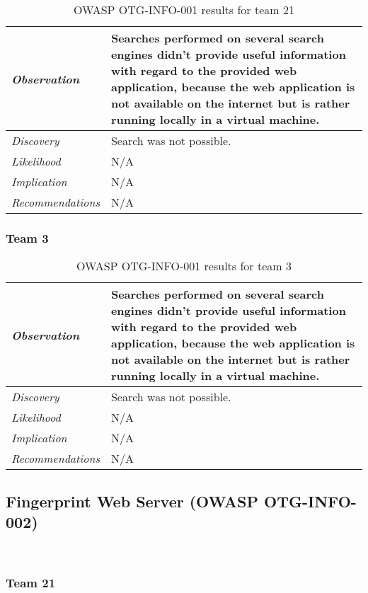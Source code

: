 \documentclass[headsepline,footsepline,footinclude=false,oneside,fontsize=11pt,paper=a4,listof=totoc,bibliography=totoc]{scrbook} %
\begin{document}
\begin{table}[H]
\centering
 \begin{tabular}{l p{11cm}} 
 \textit{Observation} & Searches performed on several search engines didn’t provide useful information with regard to the provided web application, because the web application is not available on the internet but is rather running locally in a virtual machine.\\ 
 \hline
 \textit{Discovery} & Search was not possible. \\
 \hline
 \textit{Likelihood} & N/A\\
 \hline
 \textit{Implication} & N/A\\
 \hline
 \textit{Recommendations} & N/A\\ 
\end{tabular}
\caption{OWASP OTG-INFO-001 results for team 21}
\label{table:scenario2}
\end{table}

\subsubsection{Team 3}

\begin{table}[H]
\centering
 \begin{tabular}{l p{11cm}} 
 \textit{Observation} & Searches performed on several search engines didn’t provide useful information with regard to the provided web application, because the web application is not available on the internet but is rather running locally in a virtual machine.\\ 
 \hline
 \textit{Discovery} & Search was not possible. \\
 \hline
 \textit{Likelihood} & N/A\\
 \hline
 \textit{Implication} & N/A\\
 \hline
 \textit{Recommendations} & N/A\\ 
\end{tabular}
\caption{OWASP OTG-INFO-001 results for team 3}
\label{table:scenario2}
\end{table}

\pagebreak 

\subsection{Fingerprint Web Server (OWASP OTG-INFO-002)}\

\subsubsection{Team 21}
\end{document}
